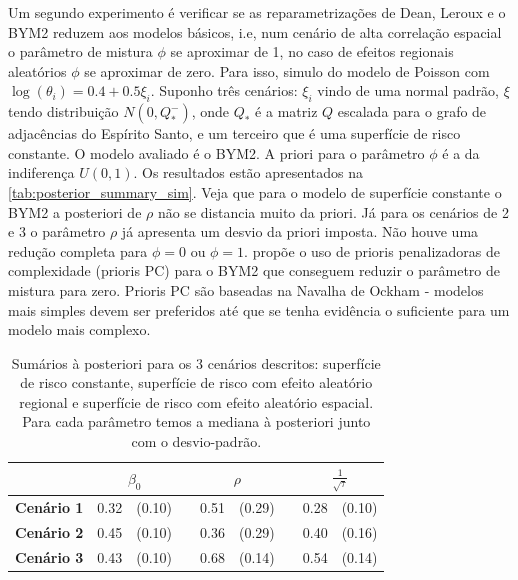 Um segundo experimento é verificar se as reparametrizações de Dean, Leroux e o BYM2 reduzem aos modelos básicos, i.e, num cenário de alta correlação espacial o parâmetro de mistura $\phi$ se aproximar de 1, no caso de efeitos regionais aleatórios $\phi$ se aproximar de zero. Para isso, simulo do modelo de Poisson com $\log(\theta_i) = 0.4 + 0.5 \xi_i$. Suponho três cenários: $\xi_i$ vindo de uma normal padrão, $\xi$ tendo distribuição $N(0,Q_*^-)$, onde $Q_*$ é a matriz $Q$ escalada para o grafo de adjacências do Espírito Santo, e um terceiro que é uma superfície de risco constante. O modelo avaliado é o BYM2. A priori para o parâmetro $\phi$ é a da indiferença $U(0,1)$.
Os resultados estão apresentados na \autoref{tab:posterior_summary_sim}. Veja que para o modelo de superfície constante o BYM2 a posteriori de $\rho$ não se distancia muito da priori. Já para os cenários de 2 e 3 o parâmetro $\rho$ já apresenta um desvio da priori imposta. Não houve uma redução completa para $\phi = 0$ ou $\phi = 1$. \cite{Simpson2015} propõe o uso de prioris penalizadoras de complexidade (prioris PC) para o BYM2 que conseguem reduzir o parâmetro de mistura para zero. Prioris PC são baseadas na Navalha de Ockham - modelos mais simples devem ser preferidos até que se tenha evidência o suficiente para um modelo mais complexo. 


\begin{table}

\centering
\begin{tabular}{@{}lrrcrrccc@{}}\toprule
& \multicolumn{2}{c}{$\beta_0$} & \phantom{ab}& \multicolumn{2}{c}{$\rho$}&\phantom{ab}& \multicolumn{2}{c}{$\frac{1}{\sqrt{\tau}}$}\\

\midrule
\textbf{Cenário 1} & 0.32 & (0.10) && 0.51 & (0.29) && 0.28 &(0.10)\\
\textbf{Cenário 2} & 0.45 & (0.10) && 0.36 & (0.29) && 0.40 &(0.16)\\ 
\textbf{Cenário 3} & 0.43 & (0.10) && 0.68 & (0.14) && 0.54 &(0.14)\\ 
\bottomrule
\end{tabular}
    \caption{Sumários à posteriori para os 3 cenários descritos: superfície de risco constante, superfície de risco com efeito aleatório regional e superfície de risco com efeito aleatório espacial. Para cada parâmetro temos a mediana à posteriori junto com o desvio-padrão.}
    \label{tab:posterior_summary_sim}
\end{table}





